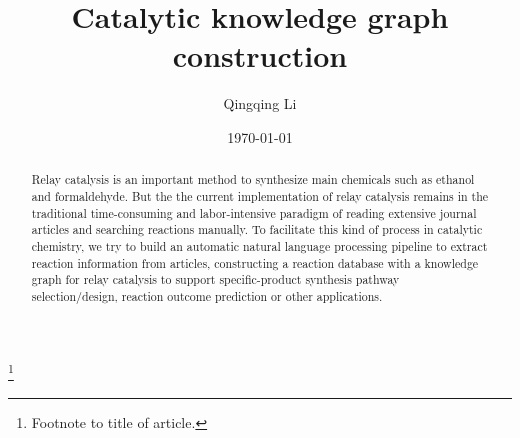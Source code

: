 \documentclass[%
 aip,
 jmp,%
 amsmath,amssymb,
 reprint,%
]{revtex4-2}
\begin{document}

\title[Catalytic knowledge graph construction]{Catalytic knowledge graph construction}%
\thanks{Footnote to title of article.}

\author{Qingqing Li}

\date{\today}%

\begin{abstract}
    
Relay catalysis is an important method to synthesize main chemicals such as ethanol and formaldehyde. But the 
the current implementation of relay catalysis remains in the traditional time-consuming 
and labor-intensive paradigm of reading extensive journal articles and searching reactions manually. 
To facilitate this kind of process in catalytic chemistry, we try to build an automatic natural 
language processing pipeline to extract reaction information from articles, constructing a reaction 
database with a knowledge graph for relay catalysis to support specific-product 
synthesis pathway selection/design, reaction outcome prediction or other applications.


%
\end{abstract}

\maketitle

\end{document}
